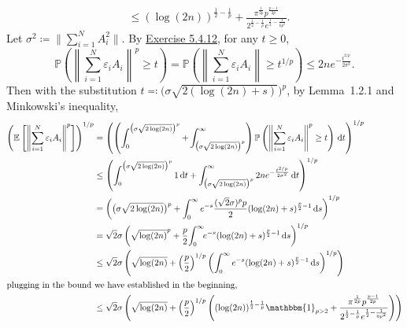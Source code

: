 \begin{answer}
\begin{align*}
		 & \leq (\log(2n))^{\frac{1}{2} - \frac{1}{p}} + \frac{\pi^{\frac{1}{2p}} p^{\frac{p-1}{2p}}}{2^{\frac{1}{2} - \frac{1}{p}} e^{\frac{1}{2} - \frac{1}{6p^2}}}.
	\end{align*}
	Let \(\sigma^2\coloneqq \lVert \sum_{i=1}^{N} A_i^2 \rVert \). By \hyperref[ex5.4.12]{Exercise 5.4.12}, for any \(t\geq 0\),
	\[
		\mathbb{P} \left( \left\lVert \sum_{i=1}^{N} \varepsilon_i A_i \right\rVert ^p \geq t \right)
		= \mathbb{P} \left( \left\lVert \sum_{i=1}^{N} \varepsilon_i A_i \right\rVert \geq t^{1 / p} \right)
		\leq 2 n e^{-\frac{t^{2/p}}{2\sigma^2}}.
	\]
	Then with the substitution \(t\eqqcolon \big(\sigma\sqrt{2(\log(2n)+s)}\big)^p\), by Lemma~1.2.1 and Minkowski's inequality,
	\[
		\begin{split}
			\left( \mathbb{E}_{}\left[\left\lVert \sum_{i=1}^N\varepsilon_iA_i \right\rVert ^p\right] \right)^{1 / p}
			 & = \left( \left( \int_{0}^{\big(\sigma\sqrt{2\log(2n)}\big)^p} + \int_{\big(\sigma\sqrt{2\log(2n)}\big)^p}^{\infty} \right) \mathbb{P} \left( \left\lVert \sum_{i=1}^{N} \varepsilon_i A_i \right\rVert ^p \geq t \right) \,\mathrm{d} t \right)^{1 / p}                       \\
			 & \leq \left( \int_{0}^{\big(\sigma\sqrt{2\log(2n)}\big)^p} 1 \,\mathrm{d} t + \int_{\big(\sigma\sqrt{2\log(2n)}\big)^p}^{\infty} 2 n e^{-\frac{t^{2/p}}{2\sigma^2}} \,\mathrm{d} t \right) ^{1 / p}                                                                            \\
			 & = \left( \big(\sigma\sqrt{2\log(2n)}\big)^p + \int_{0}^{\infty} e^{-s}\frac{(\sqrt{2}\sigma)^pp}2(\log(2n)+s)^{\frac{p}{2} - 1} \,\mathrm{d} s \right)^{1 / p}                                                                                                                \\
			 & = \sqrt{2}\sigma \left( \sqrt{\log(2n)}^{p}+\frac{p}2\!\int_{0}^{\infty}\!\!e^{-s}(\log(2n)+s)^{\frac p2-1}\,\mathrm{d} s \right) ^{1 / p}                                                                                                                                    \\
			 & \leq \sqrt{2}\sigma \left( \sqrt{\log(2n)} + \left( \frac{p}{2} \right)^{1 / p} \left( \int_{0}^{\infty} e^{-s}(\log(2n)+s)^{\frac{p}{2} - 1}\,\mathrm{d} s \right) ^{1 / p} \right)                                                                                          \\
			\shortintertext{plugging in the bound we have established in the beginning,}
			 & \leq \sqrt{2}\sigma \left( \sqrt{\log(2n)} + \left( \frac{p}{2} \right) ^{1 / p} \left( (\log(2n))^{\frac{1}{2} - \frac{1}{p}} \mathbbm{1}_{p>2} + \frac{\pi^{\frac{1}{2p}} p^{\frac{p-1}{2p}}}{2^{\frac{1}{2}-\frac{1}{p}} e^{\frac{1}{2} - \frac{1}{6p^2}}} \right) \right) \\

\end{split}\]
\end{answer}
